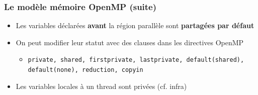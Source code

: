 \documentclass{beamer}
\begin{document}
\begin{frame}
  \frametitle{Le modèle mémoire OpenMP (suite)}

  \begin{itemize}

  \item Les variables déclarées \textbf{avant} la région parallèle sont
    \textbf{partagées par défaut}

      \medskip
      
    \item On peut modifier leur statut avec  des \alert{clauses} dans les directives OpenMP
      \begin{itemize}
      \item {\tt private, shared, firstprivate, lastprivate, default(shared),
          default(none), reduction, copyin}
      \end{itemize}

      \medskip
      
    \item Les variables locales à un thread sont privées (cf. infra)
      
    \end{itemize}  
\end{frame}
\end{document}
